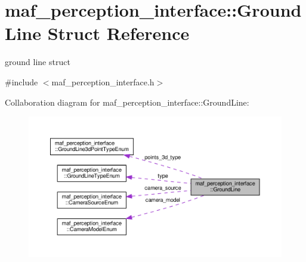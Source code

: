 \hypertarget{structmaf__perception__interface_1_1GroundLine}{}\section{maf\+\_\+perception\+\_\+interface\+:\+:Ground\+Line Struct Reference}
\label{structmaf__perception__interface_1_1GroundLine}


ground line struct  




{\ttfamily \#include $<$maf\+\_\+perception\+\_\+interface.\+h$>$}



Collaboration diagram for maf\+\_\+perception\+\_\+interface\+:\+:Ground\+Line\+:\nopagebreak
\begin{figure}[H]
\begin{center}
\leavevmode
\includegraphics[width=350pt]{structmaf__perception__interface_1_1GroundLine__coll__graph}
\end{center}
\end{figure}
